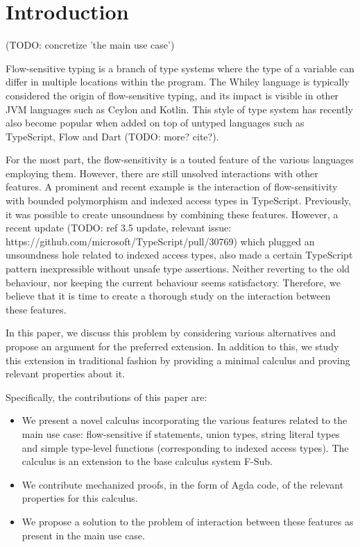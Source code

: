\section{Introduction}
\label{sec:intro}

(TODO: concretize 'the main use case')

Flow-sensitive typing is a branch of type systems where the type of a variable can differ in multiple locations within the program. The Whiley language is typically considered the origin of flow-sensitive typing, and its impact is visible in other JVM languages such as Ceylon and Kotlin. This style of type system has recently also become popular when added on top of untyped languages such as TypeScript, Flow and Dart (TODO: more? cite?).

For the most part, the flow-sensitivity is a touted feature of the various languages employing them. However, there are still unsolved interactions with other features. A prominent and recent example is the interaction of flow-sensitivity with bounded polymorphism and indexed access types in TypeScript. Previously, it was possible to create unsoundness by combining these features. However, a recent update (TODO: ref 3.5 update, relevant issue: https://github.com/microsoft/TypeScript/pull/30769) which plugged an unsoundness hole related to indexed access types, also made a certain TypeScript pattern inexpressible without unsafe type assertions. Neither reverting to the old behaviour, nor keeping the current behaviour seems satisfactory. Therefore, we believe that it is time to create a thorough study on the interaction between these features.

In this paper, we discuss this problem by considering various alternatives and propose an argument for the preferred extension. In addition to this, we study this extension in traditional fashion by providing a minimal calculus and proving relevant properties about it.

Specifically, the contributions of this paper are:

\begin{itemize}
\item We present a novel calculus incorporating the various features related to the main use case: flow-sensitive if statements, union types, string literal types and simple type-level functions (corresponding to indexed access types). The calculus is an extension to the base calculus system F-Sub.
\item We contribute mechanized proofs, in the form of Agda code, of the relevant properties for this calculus.
\item We propose a solution to the problem of interaction between these features as present in the main use case.
\end{itemize}

